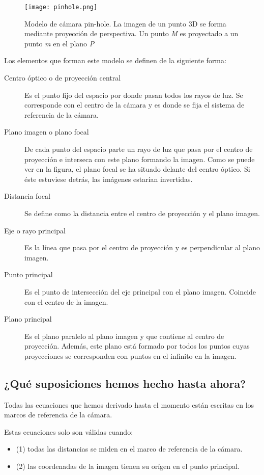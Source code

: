 \begin{figure}[h!] 
  \centering
  \texttt{[image: pinhole.png]}
  \caption{Modelo de cámara pin-hole. La imagen de un punto 3D se forma mediante proyección de perspectiva. Un punto \textit{M} es proyectado a un punto \textit{m} en el plano \textit{P}}
  \label{fig:pinholeCamera}
\end{figure}

Los elementos que forman este modelo se definen de la siguiente forma:
\begin{description}
\item[Centro óptico o de proyección central] Es el punto fijo del espacio por donde pasan todos los rayos de luz. Se corresponde con el centro de la cámara y es donde
  se fija el sistema de referencia de la cámara.
\item[Plano imagen o plano focal] De cada punto del espacio parte un rayo de luz que pasa por el centro de proyección e interseca con este plano formando la imagen.
  Como se puede ver en la figura, el plano focal se ha situado delante del centro
  óptico. Si éste estuviese detrás, las imágenes estarían invertidas.
\item[Distancia focal] Se define como la distancia entre el centro de proyección y el plano imagen.
\item[Eje o rayo principal] Es la línea que pasa por el centro de proyección y es perpendicular al plano imagen.
\item[Punto principal] Es el punto de intersección del eje principal con el plano imagen. Coincide con el centro de la imagen.
\item[Plano principal] Es el plano paralelo al plano imagen y que contiene al centro de proyección. Además, este plano está formado por todos los puntos cuyas proyecciones se corresponden con puntos en el infinito en la imagen.
\end{description}


\subsection{¿Qué suposiciones hemos hecho hasta ahora?}

Todas las ecuaciones que hemos derivado hasta el momento están escritas en los marcos de referencia de la cámara.

Estas ecuaciones solo son válidas cuando:
\begin{itemize}
    \item (1) todas las distancias se miden en el marco de referencia de la cámara.
    \item(2) las coordenadas de la imagen tienen su orígen en el punto principal.
\end{itemize}

